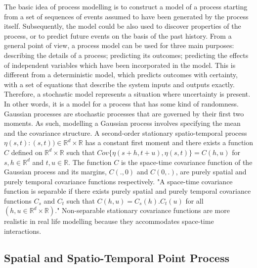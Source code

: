 \documentclass[12pt,a4paper]{report}
\begin{document}
The basic idea of process modelling is to construct a model of a process starting from a set of sequences of events assumed to have been generated by the process itself. Subsequently, the model could be also used to discover properties of the process, or to predict future events on the basis of the past history. From a general point of view, a process model can be used for three main purposes: describing the details of a process; predicting its outcomes; predicting the effects of independent variables which have been incorporated in the model. This is different from a deterministic model, which predicts outcomes with certainty, with a set of equations that describe the system inputs and outputs exactly. Therefore, a stochastic model represents a situation where uncertainty is present. In other words, it is a model for a process that has some kind of randomness.\\

Gaussian processes are stochastic processes that are governed by their first two moments. As such, modelling a Gaussian process involves specifying the mean and the covariance structure. A second-order stationary spatio-temporal process ${\eta(s,t):(s,t))\in \mathbb{R}^d \times \mathbb{R}}$ has a constant first moment and there exists a function $C$ defined on $\mathbb{R}^d \times \mathbb{R}$ such that $Cov \lbrace \eta(s+h,t+u), \eta(s,t)\rbrace = C(h,u)$ for $s,h \in \mathbb{R}^d$ and $t,u \in \mathbb{R}$. The function $C$ is the space-time covariance function of the Gaussian process and its margins, $C(.,0)$ and $C(0,.)$, are purely spatial and purely temporal covariance functions respectively.\cite{Gelfand} "A space-time covariance function is separable if there exists purely spatial and purely temporal covariance functions $C_s$ and $C_t$ such that $C(h,u) = C_s(h) . C_t(u)$ for all $(h,u \in \mathbb{R}^d \times \mathbb{R})$."\cite{Gelfand} Non-separable stationary covariance functions are more realistic in real life modelling because they accommodates space-time interactions.\\

\subsection{Spatial and Spatio-Temporal Point Process} \label{2.3.2}
\end{document}
